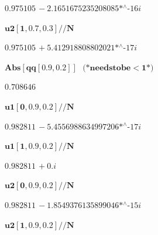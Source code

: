 {\begin{doublespace}
\noindent\(0.975105\, -\text{2.1651675235208085$\grave{ }$*${}^{\wedge}$-16} i\)
\end{doublespace}

\begin{doublespace}
\noindent\(\pmb{\text{u2}[1,0.7,0.3] \text{//}N}\)
\end{doublespace}

\begin{doublespace}
\noindent\(0.975105\, +\text{5.412918808802021$\grave{ }$*${}^{\wedge}$-17} i\)
\end{doublespace}

\begin{doublespace}
\noindent\(\pmb{\text{Abs}[\text{qq}[0.9,0.2]]\text{    }\text{(*} \text{needs} \text{to} \text{be} <1 \text{*)}}\)
\end{doublespace}

\begin{doublespace}
\noindent\(0.708646\)
\end{doublespace}

\begin{doublespace}
\noindent\(\pmb{\text{u1}[0,0.9,0.2] \text{//}N}\)
\end{doublespace}

\begin{doublespace}
\noindent\(0.982811\, -\text{5.4556988634997206$\grave{ }$*${}^{\wedge}$-17} i\)
\end{doublespace}

\begin{doublespace}
\noindent\(\pmb{\text{u1}[1,0.9,0.2] \text{//}N}\)
\end{doublespace}

\begin{doublespace}
\noindent\(0.982811\, +0. i\)
\end{doublespace}

\begin{doublespace}
\noindent\(\pmb{\text{u2}[0,0.9,0.2] \text{//}N}\)
\end{doublespace}

\begin{doublespace}
\noindent\(0.982811\, -\text{1.8549376135899046$\grave{ }$*${}^{\wedge}$-15} i\)
\end{doublespace}

\begin{doublespace}
\noindent\(\pmb{\text{u2}[1,0.9,0.2] \text{//}N}\)
\end{doublespace}

}

